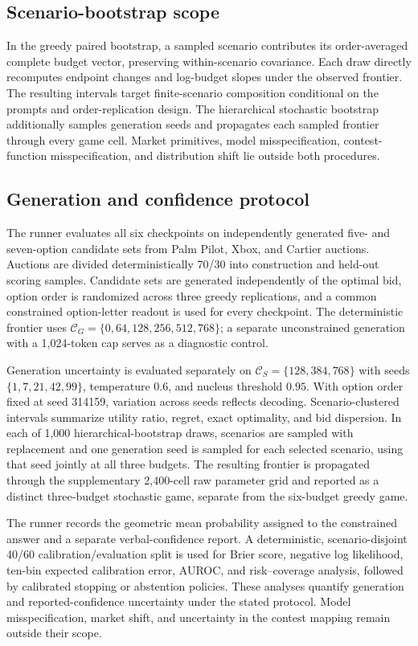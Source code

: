 \documentclass{article}
\begin{document}
\subsection{Scenario-bootstrap scope}
In the greedy paired bootstrap, a sampled scenario contributes its order-averaged complete budget vector, preserving within-scenario covariance. Each draw directly recomputes endpoint changes and log-budget slopes under the observed frontier. The resulting intervals target finite-scenario composition conditional on the prompts and order-replication design. The hierarchical stochastic bootstrap additionally samples generation seeds and propagates each sampled frontier through every game cell. Market primitives, model misspecification, contest-function misspecification, and distribution shift lie outside both procedures.

\subsection{Generation and confidence protocol}
\label{app:prospectiveuq}
The runner evaluates all six checkpoints on independently generated five- and seven-option candidate sets from Palm Pilot, Xbox, and Cartier auctions. Auctions are divided deterministically 70/30 into construction and held-out scoring samples. Candidate sets are generated independently of the optimal bid, option order is randomized across three greedy replications, and a common constrained option-letter readout is used for every checkpoint. The deterministic frontier uses $\mathcal C_G=\{0,64,128,256,512,768\}$; a separate unconstrained generation with a 1,024-token cap serves as a diagnostic control.

Generation uncertainty is evaluated separately on $\mathcal C_S=\{128,384,768\}$ with seeds $\{1,7,21,42,99\}$, temperature $0.6$, and nucleus threshold $0.95$. With option order fixed at seed 314159, variation across seeds reflects decoding. Scenario-clustered intervals summarize utility ratio, regret, exact optimality, and bid dispersion. In each of 1,000 hierarchical-bootstrap draws, scenarios are sampled with replacement and one generation seed is sampled for each selected scenario, using that seed jointly at all three budgets. The resulting frontier is propagated through the supplementary 2,400-cell raw parameter grid and reported as a distinct three-budget stochastic game, separate from the six-budget greedy game.

The runner records the geometric mean probability assigned to the constrained answer and a separate verbal-confidence report. A deterministic, scenario-disjoint 40/60 calibration/evaluation split is used for Brier score, negative log likelihood, ten-bin expected calibration error, AUROC, and risk--coverage analysis, followed by calibrated stopping or abstention policies. These analyses quantify generation and reported-confidence uncertainty under the stated protocol. Model misspecification, market shift, and uncertainty in the contest mapping remain outside their scope.
\end{document}
